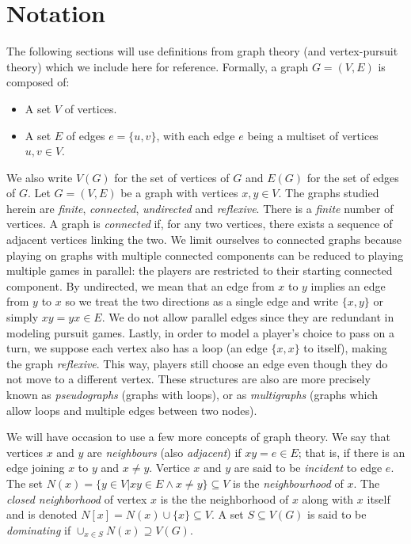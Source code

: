 \section{Notation}

The following sections will use definitions from graph theory (and vertex-pursuit theory) which we include here for reference. Formally, a graph $G = (V, E)$ is composed of:

\begin{itemize}
\item A set $V$ of vertices.
\item A set $E$ of edges $e = \{u,v\}$, with each edge $e$ being a multiset of vertices $u, v \in V$.
\end{itemize}

We also write $V(G)$ for the set of vertices of $G$ and $E(G)$ for the set of edges of $G$.
Let $G = (V,E)$ be a graph with vertices $x,y \in V$.
The graphs studied herein are \textit{finite}, \textit{connected}, \textit{undirected} and \textit{reflexive}.
There is a \textit{finite} number of vertices. A graph is \textit{connected} if, for any two vertices, there exists a sequence of adjacent vertices linking the two.
We limit ourselves to connected graphs because playing on graphs with multiple connected components can be reduced to playing multiple games in parallel: the players are restricted to their starting connected component. By undirected, we mean that an edge from $x$ to $y$ implies an edge from $y$ to $x$ so we treat the two directions as a single edge and write $\{x,y\}$ or simply $xy = yx \in E$. We do not allow parallel edges since they are redundant in modeling pursuit games.
Lastly, in order to model a player's choice to pass on a turn, we suppose each vertex also has a loop (an edge $\{x,x\}$ to itself), making the graph \textit{reflexive}. This way, players still choose an edge even though they do not move to a different vertex.  These structures are also are more precisely known as \textit{pseudographs} (graphs with loops), or as \textit{multigraphs} (graphs which allow loops and multiple edges between two nodes).

We will have occasion to use a few more concepts of graph theory. We say that vertices $x$ and $y$ are \textit{neighbours} (also \textit{adjacent}) if $xy = e \in E$; that is, if there is an edge joining $x$ to $y$ and $x \neq y$. Vertice $x$ and $y$ are said to be \textit{incident} to edge $e$.
The set $N(x) = \{ y \in V | xy \in E \land x \neq y\} \subseteq V$ is the \textit{neighbourhood} of $x$.
The \textit{closed neighborhood} of vertex $x$ is the the neighborhood of $x$ along with $x$ itself and is denoted $N[x] = N(x) \cup \{x\} \subseteq V$. A set $S \subseteq V(G)$ is said to be \textit{dominating} if $\cup_{x\in S} N(x) \supseteq V(G)$.

